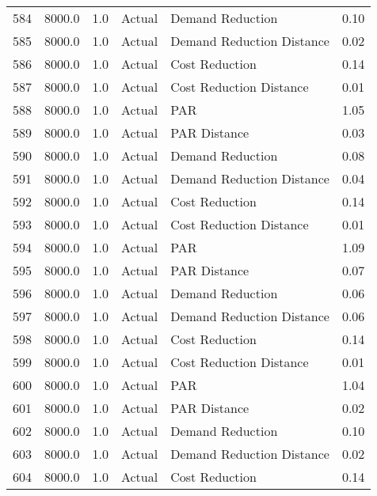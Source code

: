 \begin{longtable}{lrrllr}
584  &       8000.0 &     1.0 &         Actual &           Demand Reduction &   0.10 \\
585  &       8000.0 &     1.0 &         Actual &  Demand Reduction Distance &   0.02 \\
586  &       8000.0 &     1.0 &         Actual &             Cost Reduction &   0.14 \\
587  &       8000.0 &     1.0 &         Actual &    Cost Reduction Distance &   0.01 \\
588  &       8000.0 &     1.0 &         Actual &                        PAR &   1.05 \\
589  &       8000.0 &     1.0 &         Actual &               PAR Distance &   0.03 \\
590  &       8000.0 &     1.0 &         Actual &           Demand Reduction &   0.08 \\
591  &       8000.0 &     1.0 &         Actual &  Demand Reduction Distance &   0.04 \\
592  &       8000.0 &     1.0 &         Actual &             Cost Reduction &   0.14 \\
593  &       8000.0 &     1.0 &         Actual &    Cost Reduction Distance &   0.01 \\
594  &       8000.0 &     1.0 &         Actual &                        PAR &   1.09 \\
595  &       8000.0 &     1.0 &         Actual &               PAR Distance &   0.07 \\
596  &       8000.0 &     1.0 &         Actual &           Demand Reduction &   0.06 \\
597  &       8000.0 &     1.0 &         Actual &  Demand Reduction Distance &   0.06 \\
598  &       8000.0 &     1.0 &         Actual &             Cost Reduction &   0.14 \\
599  &       8000.0 &     1.0 &         Actual &    Cost Reduction Distance &   0.01 \\
600  &       8000.0 &     1.0 &         Actual &                        PAR &   1.04 \\
601  &       8000.0 &     1.0 &         Actual &               PAR Distance &   0.02 \\
602  &       8000.0 &     1.0 &         Actual &           Demand Reduction &   0.10 \\
603  &       8000.0 &     1.0 &         Actual &  Demand Reduction Distance &   0.02 \\
604  &       8000.0 &     1.0 &         Actual &             Cost Reduction &   0.14 \\

\end{longtable}
